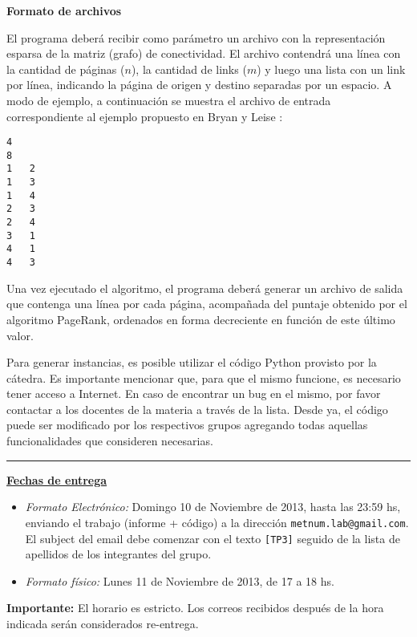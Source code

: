 \documentclass[11pt, a4paper]{article}
\begin{document}
\textbf{Formato de archivos}

El programa deber\'a recibir como par\'ametro un archivo con la representaci\'on esparsa de la matriz (grafo) de
conectividad. El archivo contendr\'a una l\'inea con la cantidad de p\'aginas ($n$), la cantidad de links ($m$) y luego
una lista con un link por l\'inea, indicando la p\'agina de origen y destino separadas por un espacio. A modo de
ejemplo, a continuaci\'on se muestra el archivo de entrada correspondiente al ejemplo propuesto en Bryan y Leise
\cite[Figura 1]{Bryan2006}: 

\begin{verbatim}
4 
8 
1   2
1   3
1   4
2   3
2   4
3   1
4   1
4   3
\end{verbatim}

Una vez ejecutado el algoritmo, el programa deber\'a generar un archivo de salida que contenga una l\'inea por cada
p\'agina, acompa\~nada del puntaje obtenido por el algoritmo PageRank, ordenados en forma decreciente en funci\'on de
este \'ultimo valor.

Para generar instancias, es posible utilizar el c\'odigo Python provisto por la c\'atedra. Es importante mencionar que, para que el mismo funcione, es
necesario tener acceso a Internet. En caso de encontrar un bug en el mismo, por favor contactar a los docentes de la
materia a trav\'es de la lista. Desde ya, el c\'odigo puede ser modificado por los respectivos grupos agregando todas
aquellas funcionalidades que consideren necesarias.

\vskip 15pt

\hrule

\vskip 11pt


{\bf \underline{Fechas de entrega}}
\begin{itemize}
 \item \emph{Formato Electr\'onico:} Domingo 10 de Noviembre de 2013, hasta las 23:59 hs, enviando el trabajo (informe +
 c\'odigo) a la direcci\'on \verb+metnum.lab@gmail.com+. El subject del email debe comenzar con el texto \verb+[TP3]+
 seguido de la lista de apellidos  de los integrantes del grupo.
 \item \emph{Formato f\'isico:} Lunes 11 de Noviembre de 2013, de 17 a 18 hs.
\end{itemize}

\noindent \textbf{Importante:} El horario es estricto. Los correos recibidos despu\'es de la hora indicada ser\'an considerados re-entrega.  



\end{document}
